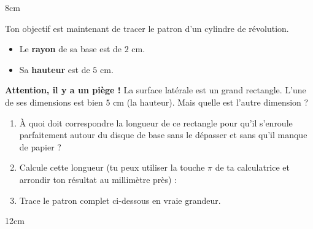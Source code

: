 \documentclass[a4paper]{book}
\begin{document}
\begin{ZoneReponse}{8cm}
\end{ZoneReponse}

\newpage

    \begin{exercice}
        Ton objectif est maintenant de tracer le patron d'un cylindre de révolution.
        \begin{itemize}
            \item Le \textbf{rayon} de sa base est de \textbf{$2\text{ cm}$}.
            \item Sa \textbf{hauteur} est de \textbf{$5\text{ cm}$}.
        \end{itemize}
        
        \textbf{Attention, il y a un piège !} La surface latérale est un grand rectangle. L'une de ses dimensions est bien $5\text{ cm}$ (la hauteur). Mais quelle est l'autre dimension ?
        
        \begin{enumerate}
            \item À quoi doit correspondre la longueur de ce rectangle pour qu'il s'enroule parfaitement autour du disque de base sans le dépasser et sans qu'il manque de papier ? \\
            \dotfill
            \item Calcule cette longueur (tu peux utiliser la touche $\pi$ de ta calculatrice et arrondir ton résultat au millimètre près) : \\
            \dotfill
            \item Trace le patron complet ci-dessous en vraie grandeur.
        \end{enumerate}
    \end{exercice}
    
    \begin{ZoneReponse}{12cm}
    \end{ZoneReponse}
\end{document}
